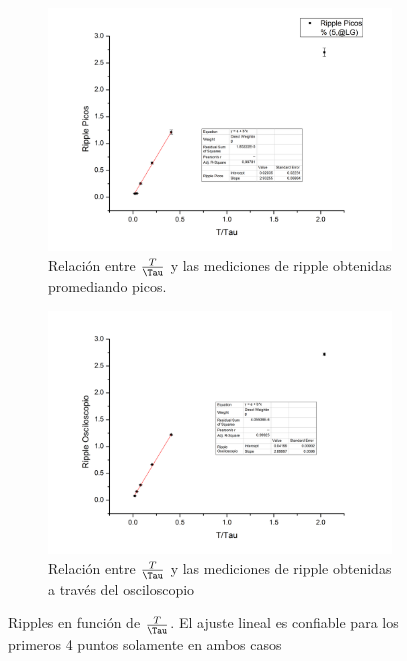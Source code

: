 \documentclass[11pt,a4paper]{article}
\begin{document}
\begin{figure}
\begin{subfigure}{0.5\textwidth}
\includegraphics[scale=0.35]{Ripple_Picos}
  \caption{Relación entre $\frac{T}{\Tau}$ y las mediciones de ripple obtenidas promediando picos.}
  \label{subfig:picos}
\end{subfigure}
\begin{subfigure}{0.5\textwidth}
\includegraphics[scale=0.35]{Ripple_Osc}
  \caption{Relación entre $\frac{T}{\Tau}$ y las mediciones de ripple obtenidas a través del osciloscopio}
  \label{subfig:osc}
\end{subfigure}
  \caption{Ripples en función de  $\frac{T}{\Tau}$. El ajuste lineal es confiable para los primeros 4 puntos solamente en ambos casos}
  \label{fig:ripples_Tau}
\end{figure}
\end{document}
